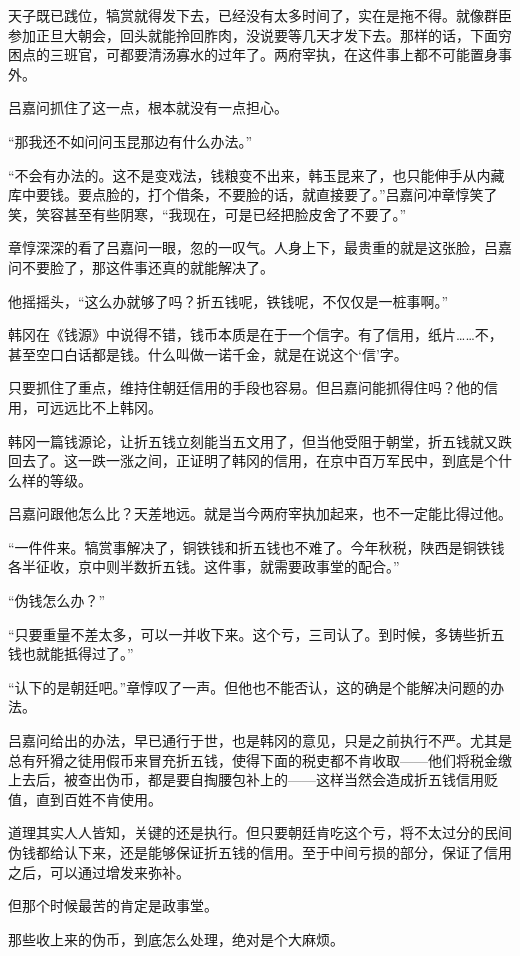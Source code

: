 天子既已践位，犒赏就得发下去，已经没有太多时间了，实在是拖不得。就像群臣参加正旦大朝会，回头就能拎回胙肉，没说要等几天才发下去。那样的话，下面穷困点的三班官，可都要清汤寡水的过年了。两府宰执，在这件事上都不可能置身事外。

吕嘉问抓住了这一点，根本就没有一点担心。

“那我还不如问问玉昆那边有什么办法。”

“不会有办法的。这不是变戏法，钱粮变不出来，韩玉昆来了，也只能伸手从内藏库中要钱。要点脸的，打个借条，不要脸的话，就直接要了。”吕嘉问冲章惇笑了笑，笑容甚至有些阴寒，“我现在，可是已经把脸皮舍了不要了。”

章惇深深的看了吕嘉问一眼，忽的一叹气。人身上下，最贵重的就是这张脸，吕嘉问不要脸了，那这件事还真的就能解决了。

他摇摇头，“这么办就够了吗？折五钱呢，铁钱呢，不仅仅是一桩事啊。”

韩冈在《钱源》中说得不错，钱币本质是在于一个信字。有了信用，纸片……不，甚至空口白话都是钱。什么叫做一诺千金，就是在说这个‘信’字。

只要抓住了重点，维持住朝廷信用的手段也容易。但吕嘉问能抓得住吗？他的信用，可远远比不上韩冈。

韩冈一篇钱源论，让折五钱立刻能当五文用了，但当他受阻于朝堂，折五钱就又跌回去了。这一跌一涨之间，正证明了韩冈的信用，在京中百万军民中，到底是个什么样的等级。

吕嘉问跟他怎么比？天差地远。就是当今两府宰执加起来，也不一定能比得过他。

“一件件来。犒赏事解决了，铜铁钱和折五钱也不难了。今年秋税，陕西是铜铁钱各半征收，京中则半数折五钱。这件事，就需要政事堂的配合。”

“伪钱怎么办？”

“只要重量不差太多，可以一并收下来。这个亏，三司认了。到时候，多铸些折五钱也就能抵得过了。”

“认下的是朝廷吧。”章惇叹了一声。但他也不能否认，这的确是个能解决问题的办法。

吕嘉问给出的办法，早已通行于世，也是韩冈的意见，只是之前执行不严。尤其是总有歼猾之徒用假币来冒充折五钱，使得下面的税吏都不肯收取——他们将税金缴上去后，被查出伪币，都是要自掏腰包补上的——这样当然会造成折五钱信用贬值，直到百姓不肯使用。

道理其实人人皆知，关键的还是执行。但只要朝廷肯吃这个亏，将不太过分的民间伪钱都给认下来，还是能够保证折五钱的信用。至于中间亏损的部分，保证了信用之后，可以通过增发来弥补。

但那个时候最苦的肯定是政事堂。

那些收上来的伪币，到底怎么处理，绝对是个大麻烦。

